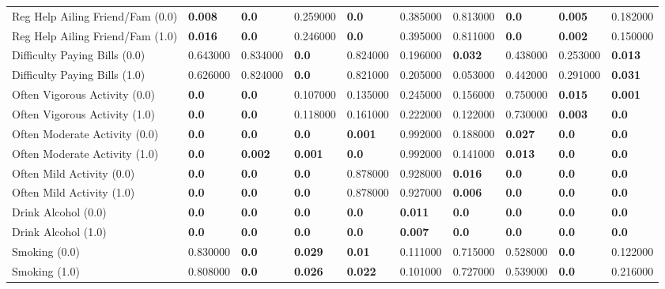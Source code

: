 \begin{tabular}{llllllllll}
Reg Help Ailing Friend/Fam (0.0) & \textbf{0.008} & \textbf{0.0} & 0.259000 & \textbf{0.0} & 0.385000 & 0.813000 & \textbf{0.0} & \textbf{0.005} & 0.182000 \\
Reg Help Ailing Friend/Fam (1.0) & \textbf{0.016} & \textbf{0.0} & 0.246000 & \textbf{0.0} & 0.395000 & 0.811000 & \textbf{0.0} & \textbf{0.002} & 0.150000 \\
Difficulty Paying Bills (0.0) & 0.643000 & 0.834000 & \textbf{0.0} & 0.824000 & 0.196000 & \textbf{0.032} & 0.438000 & 0.253000 & \textbf{0.013} \\
Difficulty Paying Bills (1.0) & 0.626000 & 0.824000 & \textbf{0.0} & 0.821000 & 0.205000 & 0.053000 & 0.442000 & 0.291000 & \textbf{0.031} \\
Often Vigorous Activity (0.0) & \textbf{0.0} & \textbf{0.0} & 0.107000 & 0.135000 & 0.245000 & 0.156000 & 0.750000 & \textbf{0.015} & \textbf{0.001} \\
Often Vigorous Activity (1.0) & \textbf{0.0} & \textbf{0.0} & 0.118000 & 0.161000 & 0.222000 & 0.122000 & 0.730000 & \textbf{0.003} & \textbf{0.0} \\
Often Moderate Activity (0.0) & \textbf{0.0} & \textbf{0.0} & \textbf{0.0} & \textbf{0.001} & 0.992000 & 0.188000 & \textbf{0.027} & \textbf{0.0} & \textbf{0.0} \\
Often Moderate Activity (1.0) & \textbf{0.0} & \textbf{0.002} & \textbf{0.001} & \textbf{0.0} & 0.992000 & 0.141000 & \textbf{0.013} & \textbf{0.0} & \textbf{0.0} \\
Often Mild Activity (0.0) & \textbf{0.0} & \textbf{0.0} & \textbf{0.0} & 0.878000 & 0.928000 & \textbf{0.016} & \textbf{0.0} & \textbf{0.0} & \textbf{0.0} \\
Often Mild Activity (1.0) & \textbf{0.0} & \textbf{0.0} & \textbf{0.0} & 0.878000 & 0.927000 & \textbf{0.006} & \textbf{0.0} & \textbf{0.0} & \textbf{0.0} \\
Drink Alcohol (0.0) & \textbf{0.0} & \textbf{0.0} & \textbf{0.0} & \textbf{0.0} & \textbf{0.011} & \textbf{0.0} & \textbf{0.0} & \textbf{0.0} & \textbf{0.0} \\
Drink Alcohol (1.0) & \textbf{0.0} & \textbf{0.0} & \textbf{0.0} & \textbf{0.0} & \textbf{0.007} & \textbf{0.0} & \textbf{0.0} & \textbf{0.0} & \textbf{0.0} \\
Smoking (0.0) & 0.830000 & \textbf{0.0} & \textbf{0.029} & \textbf{0.01} & 0.111000 & 0.715000 & 0.528000 & \textbf{0.0} & 0.122000 \\
Smoking (1.0) & 0.808000 & \textbf{0.0} & \textbf{0.026} & \textbf{0.022} & 0.101000 & 0.727000 & 0.539000 & \textbf{0.0} & 0.216000 \\
\bottomrule
\end{tabular}
